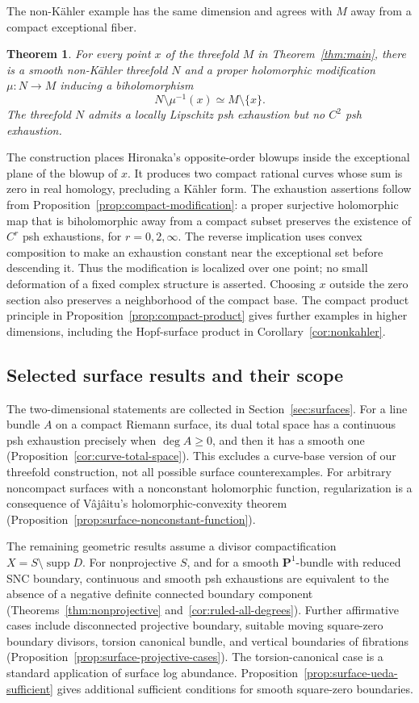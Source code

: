 \documentclass[11pt]{amsart}
\newtheorem{theorem}{Theorem}[section]
\theoremstyle{definition}
\theoremstyle{remark}
\numberwithin{equation}{section}
\newcommand{\PP}{\mathbf P}
\newcommand{\supp}{\operatorname{supp}}
\begin{document}
The non-K\"ahler example has the same dimension and agrees with $M$
away from a compact exceptional fiber.

\begin{theorem}\label{thm:nonkahler-threefold}
For every point $x$ of the threefold $M$ in Theorem~\ref{thm:main}, there
is a smooth non-K\"ahler threefold $N$ and a proper holomorphic
modification $\mu:N\to M$ inducing a biholomorphism
\[
 N\setminus\mu^{-1}(x)\simeq M\setminus\{x\}.
\]
The threefold $N$ admits a locally Lipschitz psh exhaustion but no
$C^2$ psh exhaustion.
\end{theorem}

The construction places Hironaka's opposite-order blowups inside the
exceptional plane of the blowup of $x$. It produces two compact rational
curves whose sum is zero in real homology, precluding a K\"ahler form.
The exhaustion assertions follow from Proposition~\ref{prop:compact-modification}:
a proper surjective holomorphic map that is biholomorphic away from a compact
subset preserves the existence of $C^r$ psh exhaustions, for
$r=0,2,\infty$. The reverse implication uses convex composition to
make an exhaustion constant near the exceptional set before descending
it. Thus the modification is localized over one point; no small
deformation of a fixed complex structure is asserted. Choosing $x$
outside the zero section also preserves a neighborhood of the compact
base. The compact product principle in Proposition~\ref{prop:compact-product}
gives further examples in higher dimensions, including the Hopf-surface
product in Corollary~\ref{cor:nonkahler}.


\subsection{Selected surface results and their scope}

The two-dimensional statements are collected in Section~\ref{sec:surfaces}.
For a line bundle $A$ on a compact Riemann surface, its dual total
space has a continuous psh exhaustion precisely when $\deg A\ge0$,
and then it has a smooth one (Proposition~\ref{cor:curve-total-space}).
This excludes a curve-base version of our threefold construction, not
all possible surface counterexamples. For arbitrary noncompact
surfaces with a nonconstant holomorphic function, regularization is
a consequence of V\^aj\^aitu's holomorphic-convexity theorem
(Proposition~\ref{prop:surface-nonconstant-function}).

The remaining geometric results assume a divisor compactification
$X=S\setminus\supp D$. For nonprojective $S$, and for a smooth
$\PP^1$-bundle with reduced SNC boundary, continuous and smooth psh
exhaustions are equivalent to the absence of a negative definite
connected boundary component (Theorems~\ref{thm:nonprojective}
and~\ref{cor:ruled-all-degrees}). Further affirmative cases include
disconnected projective boundary, suitable moving square-zero
boundary divisors, torsion canonical bundle, and vertical boundaries
of fibrations (Proposition~\ref{prop:surface-projective-cases}).
The torsion-canonical case is a standard application of surface log
abundance. Proposition~\ref{prop:surface-ueda-sufficient} gives
additional sufficient conditions for smooth square-zero boundaries.
\end{document}
